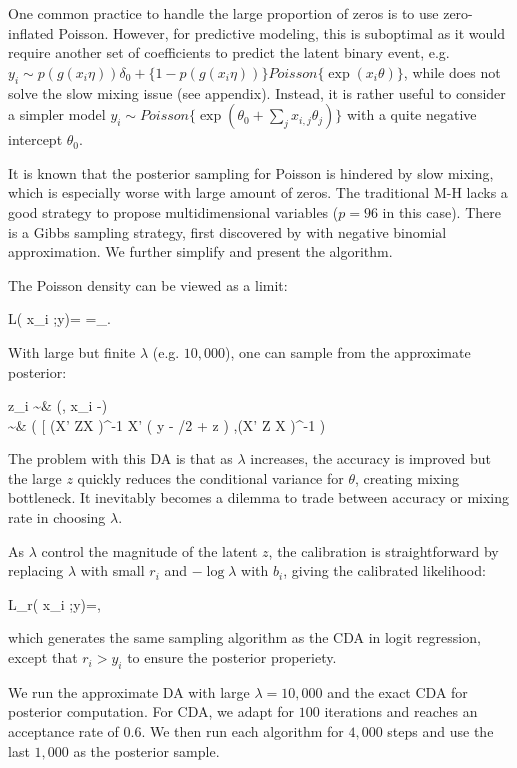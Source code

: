 \documentclass[10pt]{article}
\newcommand{\xbeta}{ x_i \theta}
\newcommand{\be}{\begin{equs}}
\newcommand{\ee}{\end{equs}}
\DeclareMathOperator{\No}{No}
\DeclareMathOperator{\PG}{PG}
\begin{document}
One common practice to handle the large proportion of zeros is to use zero-inflated Poisson. However, for predictive modeling, this is suboptimal as it would require another set of coefficients to predict the latent binary event, e.g. $y_i\sim p\left( g(x_i\eta)\right)  \delta_0+ \{ 1-p\left( g(x_i \eta) \right) \} Poisson\{\exp (x_i \theta)\}$, while does not solve the slow mixing issue (see appendix). Instead, it is rather useful to consider a simpler model  $y_i\sim Poisson\{\exp(\theta_0+ \sum_j x_{i,j}\theta_j)\}$ with a quite negative intercept $\theta_0$.

It is known that the posterior sampling for Poisson is hindered by slow mixing, which is especially worse with large amount of zeros. The traditional M-H lacks a good strategy to propose multidimensional variables ($p=96$ in this case). There is a Gibbs sampling strategy, first discovered by \citep{zhou2012lognormal} with negative binomial approximation. We further simplify and present the algorithm.

The Poisson density can be viewed as a limit:
\be
L(\xbeta;y)=\frac{ \exp(y_i \xbeta)}{\exp\{\exp(\xbeta)\}y!} =\lim_{\lambda\rightarrow\infty}\frac{\exp(y_i \xbeta)}{\{1+ \exp(\xbeta)/\lambda\}^{\lambda}y!}.
\ee

With large but finite $\lambda$ (e.g. $10,000$), one can sample from the approximate posterior:

\be
z_i \sim & \PG\left (\lambda, \xbeta -\log \lambda\right)\\
\theta \sim & \No \left( \big[ (X' ZX )^{-1} X'  \big ( y - \lambda/2 + z \log \lambda \big) ,(X' Z X )^{-1} \right)
\ee

The problem with this DA is that as $\lambda$ increases, the accuracy is improved but the large $z$ quickly reduces the conditional variance for $\theta$, creating mixing bottleneck. It inevitably becomes a dilemma to trade between accuracy or mixing rate in choosing $\lambda$.

As $\lambda$ control the magnitude of the latent $z$, the calibration is straightforward by replacing $\lambda$ with small $r_i$ and $-\log \lambda$ with $b_i$, giving the calibrated likelihood:

\be
L_r(\xbeta;y)=\frac{\exp \{ y_i (\xbeta + b_i)\}}{\{1+ \exp (\xbeta + b_i)\}^{r_i}},
\ee
which generates the same sampling algorithm as the CDA in logit regression, except that $r_i>y_i$ to ensure the posterior properiety.

We run the approximate DA with large $\lambda=10,000$ and the exact CDA for posterior computation. For CDA, we adapt for $100$ iterations and reaches an acceptance rate of $0.6$. We then run each algorithm for $4,000$ steps and use the last $1,000$ as the posterior sample.
\end{document}
